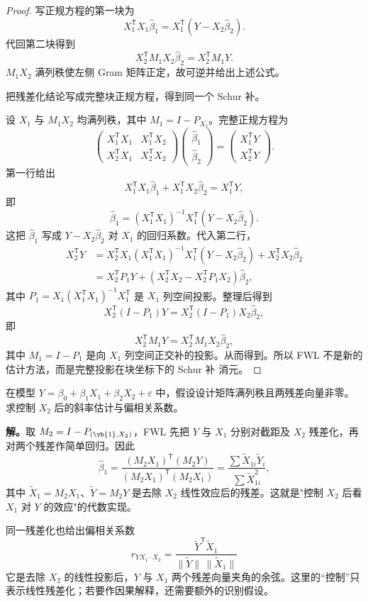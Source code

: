 \begin{proof}
写正规方程的第一块为
\[
 X_1^{\mathsf T}X_1\widehat\beta_1
 =X_1^{\mathsf T}(Y-X_2\widehat\beta_2).
\]
代回第二块得到
\[
 X_2^{\mathsf T}M_1X_2\widehat\beta_2=X_2^{\mathsf T}M_1Y.
\]
$M_1X_2$ 满列秩使左侧 Gram 矩阵正定，故可逆并给出上述公式。

把残差化结论写成完整块正规方程，得到同一个 Schur 补。

设 $X_1$ 与 $M_1X_2$ 均满列秩，其中 $M_1=I-P_{X_1}$。完整正规方程为
\[
 \begin{pmatrix}
 X_1^{\mathsf T}X_1 & X_1^{\mathsf T}X_2\\
 X_2^{\mathsf T}X_1 & X_2^{\mathsf T}X_2
 \end{pmatrix}
 \begin{pmatrix}
 \widehat\beta_1\\
 \widehat\beta_2
 \end{pmatrix}
 =
 \begin{pmatrix}
 X_1^{\mathsf T}Y\\
 X_2^{\mathsf T}Y
 \end{pmatrix}.
\]
第一行给出
\[
 X_1^{\mathsf T}X_1\widehat\beta_1+X_1^{\mathsf T}X_2\widehat\beta_2=X_1^{\mathsf T}Y,
\]
即
\[
 \widehat\beta_1
 =(X_1^{\mathsf T}X_1)^{-1}
 X_1^{\mathsf T}(Y-X_2\widehat\beta_2).
\]
这把 $\widehat\beta_1$ 写成 $Y-X_2\widehat\beta_2$ 对 $X_1$ 的回归系数。代入第二行，
\begin{align*}
 X_2^{\mathsf T}Y
 &=X_2^{\mathsf T}X_1
 (X_1^{\mathsf T}X_1)^{-1}
 X_1^{\mathsf T}(Y-X_2\widehat\beta_2)
 +X_2^{\mathsf T}X_2\widehat\beta_2\\
 &=X_2^{\mathsf T}P_1Y+(X_2^{\mathsf T}X_2-X_2^{\mathsf T}P_1X_2)\widehat\beta_2,
\end{align*}
其中 $P_1=X_1(X_1^{\mathsf T}X_1)^{-1}X_1^{\mathsf T}$ 是 $X_1$ 列空间投影。整理后得到
\[
 X_2^{\mathsf T}(I-P_1)Y
 =X_2^{\mathsf T}(I-P_1)X_2\widehat\beta_2,
\]
即
\[
 X_2^{\mathsf T}M_1Y
 =X_2^{\mathsf T}M_1X_2\widehat\beta_2,
\]
其中 $M_1=I-P_1$ 是向 $X_1$ 列空间正交补的投影。从而得到。所以 FWL 不是新的估计方法，而是完整投影在块坐标下的 Schur 补 消元。
\end{proof}

\begin{workedexample}[控制协变量与偏相关]
在模型 $Y=\beta_0+\beta_1X_1+\beta_2X_2+\varepsilon$ 中，假设设计矩阵满列秩且两残差向量非零。求控制 $X_2$ 后的斜率估计与偏相关系数。

\textbf{解。}取 $M_2=I-P_{(\vb{1},X_2)}$，FWL 先把 $Y$ 与 $X_1$ 分别对截距及 $X_2$ 残差化，再对两个残差作简单回归。因此
\[
\widehat\beta_1=\frac{(M_2X_1)^{\mathsf T}(M_2Y)}{(M_2X_1)^{\mathsf T}(M_2X_1)}
=\frac{\sum\tilde X_{1i}\tilde Y_i}{\sum\tilde X_{1i}^2},
\]
其中 $\tilde X_1=M_2X_1$、$\tilde Y=M_2Y$ 是去除 $X_2$ 线性效应后的残差。这就是"控制 $X_2$ 后看 $X_1$ 对 $Y$ 的效应"的代数实现。

同一残差化也给出偏相关系数
\[
r_{YX_1\cdot X_2}=\frac{\tilde Y^{\mathsf T}\tilde X_1}{\|\tilde Y\|\,\|\tilde X_1\|}
\]
它是去除 $X_2$ 的线性投影后，$Y$ 与 $X_1$ 两个残差向量夹角的余弦。这里的“控制”只表示线性残差化；若要作因果解释，还需要额外的识别假设。
\end{workedexample}

